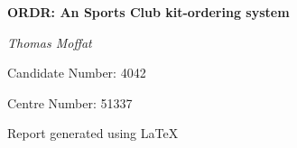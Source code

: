 \documentclass[
11pt, %
a4paper, %
oneside, %
headinclude,footinclude, %
BCOR5mm, %
]{scrartcl}
\begin{document}

\renewcommand{\sectionmark}[1]{\markright{\spacedlowsmallcaps{#1}}} %
\lehead{\mbox{\llap{\small\thepage\kern1em\color{halfgray} \vline}\color{halfgray}\hspace{0.5em}\rightmark\hfil}} %

\pagestyle{scrheadings} %


\begin{titlepage}
	\vspace{5cm}
	\centering
	{\huge\bfseries ORDR: An Sports Club kit-ordering system\par}
	\vspace{2cm}
	{\Large\itshape Thomas Moffat\par}
	\vspace{1cm}
	{Candidate Number: 4042\par}
	\vspace{1cm}
	{Centre Number: 51337\par}
	\vspace{10cm}
	{Report generated using \LaTeX}
	\vfill
\end{titlepage}

\setcounter{tocdepth}{3} %

\tableofcontents %

\listoffigures

\listoftables



\end{document}
